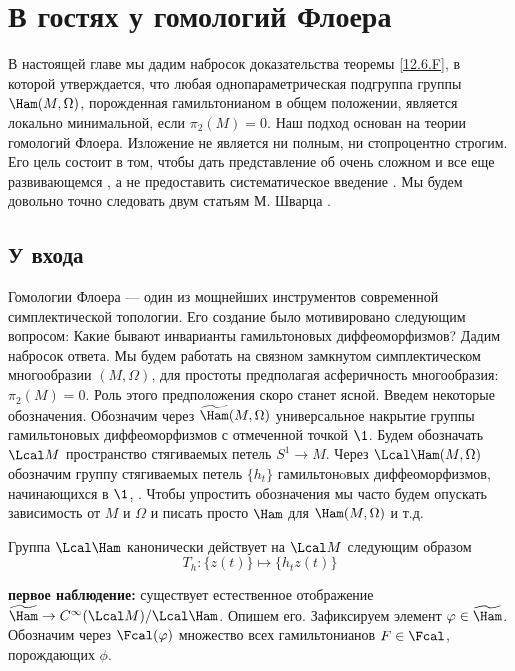 \chapter[Гомологии Флоера]{В гостях у гомологий Флоера}\label{sec:13}

В настоящей главе мы дадим набросок доказательства теоремы
\ref{12.6.F}, в которой утверждается, что любая однопараметрическая
подгруппа группы $\Ham(M, \Omega)$, порожденная гамильтонианом в общем
положении, является локально минимальной, если $π_{2}(M) = 0$.
Наш подход основан на теории гомологий Флоера.
Изложение не является
ни полным, ни стопроцентно строгим.
Его цель состоит в том, чтобы дать представление об очень сложном и
все еще развивающемся , а не
предоставить систематическое введение .
Мы будем довольно точно следовать двум статьям М. Шварца \cite{Sch2,
  Sch3}.

\section{У входа}\label{sec:13.1}

Гомологии Флоера --- один из мощнейших инструментов современной
симплектической топологии. 
Его создание было мотивировано следующим вопросом: Какие бывают инварианты
гамильтоновых диффеоморфизмов?
Дадим набросок ответа.
Мы будем работать на связном замкнутом симплектическом многообразии
$(M,\Omega)$, для простоты предполагая асферичность многообразия:
$π_{2}(M) = 0$.
Роль этого предположения скоро станет ясной.
Введем некоторые обозначения.
Обозначим через $\widetilde\Ham(M,\Omega)$ универсальное накрытие
группы гамильтоновых диффеоморфизмов с отмеченной точкой $\1$.
Будем обозначать $\Lcal M$ пространство стягиваемых петель $S^{1}\to
M$.
Через $\Lcal\Ham(M,\Omega)$ обозначим группу стягиваемых петель
$\{h_{t}\}$ гамильтонoвых диффеоморфизмов, начинающихся в $\1$,
.
Чтобы упростить обозначения мы часто будем опускать зависимость от $M$
и $\Omega$ и писать просто $\Ham$ для $\Ham(M, \Omega)$ и т.д. 

Группа $\Lcal\Ham$ канонически действует на $\Lcal M$
следующим образом
\[
T_{h}: \{z(t)\}\mapsto \{h_{t}z(t)\}
\]

  
\noindent\textbf{первое наблюдение:} существует естественное
отображение $\widetilde\Ham\z\to C^{\infty}(\Lcal M)/\Lcal\Ham$.
Опишем его. Зафиксируем элемент $\phi\in\widetilde\Ham$. Обозначим
через $\Fcal(\phi)$ множество всех гамильтонианов $F\in\Fcal$,
порождающих $\phi$.

